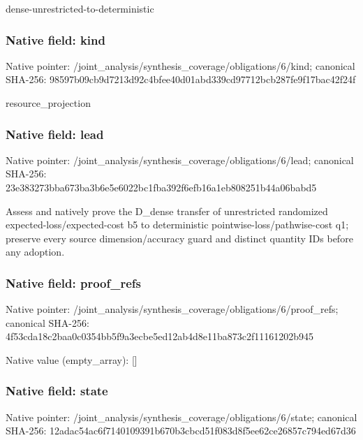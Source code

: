 \documentclass[10pt,a4paper]{article}
\begin{document}
\begingroup\raggedright\sloppy dense-unrestricted-to-deterministic\par\endgroup

\subsubsection{Native field: kind}
Native pointer: /joint\_\allowbreak{}analysis/synthesis\_\allowbreak{}coverage/obligations/6/kind; canonical SHA-256: 98597b09cb9d7213d92c4bfee40d01abd339cd97712bcb287fe9f17bac42f24f

\begingroup\raggedright\sloppy resource\_\allowbreak{}projection\par\endgroup

\subsubsection{Native field: lead}
Native pointer: /joint\_\allowbreak{}analysis/synthesis\_\allowbreak{}coverage/obligations/6/lead; canonical SHA-256: 23e383273bba673ba3b6e5e6022bc1fba392f6efb16a1eb808251b44a06babd5

\begingroup\raggedright\sloppy Assess and natively prove the D\_\allowbreak{}dense transfer of unrestricted randomized expected-loss/\allowbreak{}expected-cost b5 to deterministic pointwise-loss/\allowbreak{}pathwise-cost q1;\allowbreak{} preserve every source dimension/\allowbreak{}accuracy guard and distinct quantity IDs before any adoption.\par\endgroup

\subsubsection{Native field: proof\_\allowbreak{}refs}
Native pointer: /joint\_\allowbreak{}analysis/synthesis\_\allowbreak{}coverage/obligations/6/proof\_\allowbreak{}refs; canonical SHA-256: 4f53cda18c2baa0c0354bb5f9a3ecbe5ed12ab4d8e11ba873c2f11161202b945

Native value (empty\_\allowbreak{}array): []

\subsubsection{Native field: state}
Native pointer: /joint\_\allowbreak{}analysis/synthesis\_\allowbreak{}coverage/obligations/6/state; canonical SHA-256: 12adac54ac6f7140109391b670b3cbcd51f083d8f5ee62ce26857c794ed67d36
\end{document}
